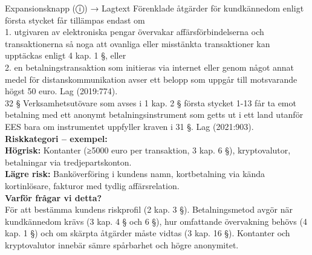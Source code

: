 \documentclass[10pt]{beamer}
\begin{document}
\begin{frame}[label=riskfragor-steg3]
\begin{alertblock}{Expansionsknapp (ⓘ) → Lagtext}
    Förenklade åtgärder för kundkännedom enligt första stycket får tillämpas endast om\\
    1. utgivaren av elektroniska pengar övervakar affärsförbindelserna och transaktionerna 
    så noga att ovanliga eller misstänkta transaktioner kan upptäckas enligt 4 kap. 1 §, eller\\
    2. en betalningstransaktion som initieras via internet eller genom något annat medel för distanskommunikation avser ett belopp som uppgår till motsvarande högst 50 euro.
    Lag (2019:774).\\

    32 §   Verksamhetsutövare som avses i 1 kap. 2 § första stycket 1-13 får ta emot betalning med 
    ett anonymt betalningsinstrument som getts ut i ett land utanför EES bara om instrumentet 
    uppfyller kraven i 31 §. Lag (2021:903).\\[0.1cm]

    \tiny \textbf{Riskkategori – exempel:}\\
    \tiny \textbf{Högrisk:} Kontanter (≥5000 euro per transaktion, 3 kap. 6 §), kryptovalutor, betalningar via tredjepartskonton.\\
    \tiny \textbf{Lägre risk:} Banköverföring i kundens namn, kortbetalning via kända kortinlösare, fakturor med tydlig affärsrelation.\\[0.1cm]
    \tiny \textbf{Varför frågar vi detta?}\\
    \tiny För att bestämma kundens riskprofil (2 kap. 3 §). Betalningsmetod avgör när kundkännedom krävs (3 kap. 4 § och 6 §), hur omfattande övervakning behövs (4 kap. 1 §) och om skärpta åtgärder måste vidtas (3 kap. 16 §). Kontanter och kryptovalutor innebär sämre spårbarhet och högre anonymitet.
  \end{alertblock}

  \vspace{0.3cm}


\end{frame}
\end{document}
